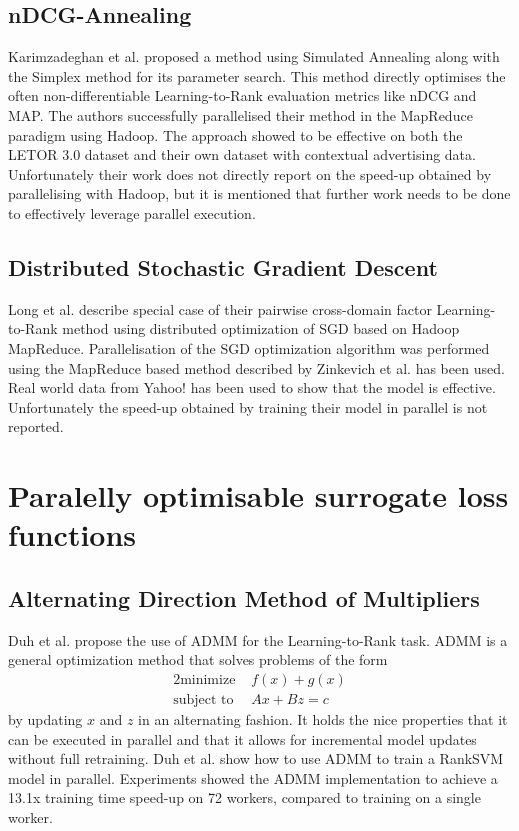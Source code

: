 \subsection{nDCG-Annealing}
Karimzadeghan et al. \cite{Karimzadehgan2011} proposed a method using Simulated Annealing along with the Simplex method for its parameter search. This method directly optimises the often non-differentiable Learning-to-Rank evaluation metrics like \ac{nDCG} and \ac{MAP}. The authors successfully parallelised their method in the MapReduce paradigm using Hadoop. The approach showed to be effective on both the LETOR 3.0 dataset and their own dataset with contextual advertising data. Unfortunately their work does not directly report on the speed-up obtained by parallelising  with Hadoop, but it is mentioned that further work needs to be done to effectively leverage parallel execution.
\subsection{Distributed Stochastic Gradient Descent}
Long et al. \cite{Long2012} describe special case of their pairwise cross-domain factor Learning-to-Rank method using distributed optimization of \ac{SGD} based on Hadoop MapReduce. Parallelisation of the \ac{SGD} optimization algorithm was performed using the MapReduce based method described by  Zinkevich et al. \cite{Zinkevich2010} has been used. Real world data from Yahoo! has been used to show that the model is effective. Unfortunately the speed-up obtained by training their model in parallel is not reported.\\

\section{Paralelly optimisable surrogate loss functions}
\subsection{Alternating Direction Method of Multipliers}
Duh et al. \cite{Duh2011} propose the use of \ac{ADMM} for the Learning-to-Rank task. \ac{ADMM} is a general optimization method that solves problems of the form
\begin{alignat*}{2}
\text{minimize }   &  f(x) + g(x) \\
\text{subject to } &  Ax + Bz = c
\end{alignat*}
by updating $x$ and $z$ in an alternating fashion. It holds the nice properties that it can be executed in parallel and that it allows for incremental model updates without full retraining. Duh et al. \cite{Duh2011} show how to use \ac{ADMM} to train a RankSVM model in parallel. Experiments showed the \ac{ADMM} implementation to achieve a 13.1x training time speed-up on 72 workers, compared to training on a single worker.\\

